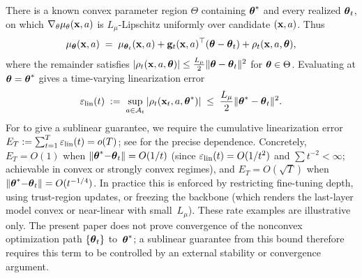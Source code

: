 \documentclass[twoside]{article}
\begin{document}
\begin{assumption}\label{asm:linear}
There is a known convex parameter region $\Theta$ containing
$\boldsymbol{\theta}^*$ and every realized $\boldsymbol{\theta}_t$, on which
$\nabla_\theta\mu_\theta(\mathbf{x},a)$ is $L_\mu$-Lipschitz uniformly over
candidate $(\mathbf{x},a)$.  Thus
\begin{equation}\label{eq:linearization}
  \mu_{\boldsymbol{\theta}}(\mathbf{x},a) \;=\;
    \mu_{\boldsymbol{\theta}_t}(\mathbf{x},a)
    + \mathbf{g}_t(\mathbf{x},a)^\top(\boldsymbol{\theta} - \boldsymbol{\theta}_t)
    + \rho_t(\mathbf{x},a,\boldsymbol{\theta}),
\end{equation}
where the remainder satisfies
$|\rho_t(\mathbf{x},a,\boldsymbol{\theta})| \le \tfrac{L_\mu}{2}\|\boldsymbol{\theta}-\boldsymbol{\theta}_t\|^2$
for $\boldsymbol{\theta}\in\Theta$.
Evaluating at $\boldsymbol{\theta}=\boldsymbol{\theta}^*$ gives a time-varying linearization error
\begin{equation}\label{eq:epslin-t}
  \varepsilon_{\mathrm{lin}}(t)
  \;:=\;
  \sup_{a\in\mathcal{A}_t}|\rho_t(\mathbf{x}_t,a,\boldsymbol{\theta}^*)|
  \;\le\;
  \frac{L_\mu}{2}\|\boldsymbol{\theta}^* - \boldsymbol{\theta}_t\|^2.
\end{equation}
For  to give a sublinear guarantee, we require the cumulative linearization
error $E_T:=\sum_{t=1}^{T}\varepsilon_{\mathrm{lin}}(t) = o(T)$; see 
for the precise dependence.  Concretely, $E_T=O(1)$ when
$\|\boldsymbol{\theta}^*{-}\boldsymbol{\theta}_t\|=O(1/t)$ (since
$\varepsilon_{\mathrm{lin}}(t)=O(1/t^2)$ and $\sum t^{-2}<\infty$;
achievable in convex or strongly convex regimes),
and $E_T=O(\sqrt{T})$ when
$\|\boldsymbol{\theta}^*{-}\boldsymbol{\theta}_t\|=O(t^{-1/4})$.
In practice this is enforced by restricting fine-tuning depth,
	using trust-region updates, or freezing the backbone (which renders the
	last-layer model convex or near-linear with small~$L_\mu$).
These rate examples are illustrative only.  The present paper does not
prove convergence of the nonconvex optimization path
$\{\boldsymbol{\theta}_t\}$ to~$\boldsymbol{\theta}^*$; a sublinear guarantee from this bound therefore
requires this term to be controlled by an external stability or convergence
argument.
\end{assumption}
\end{document}
